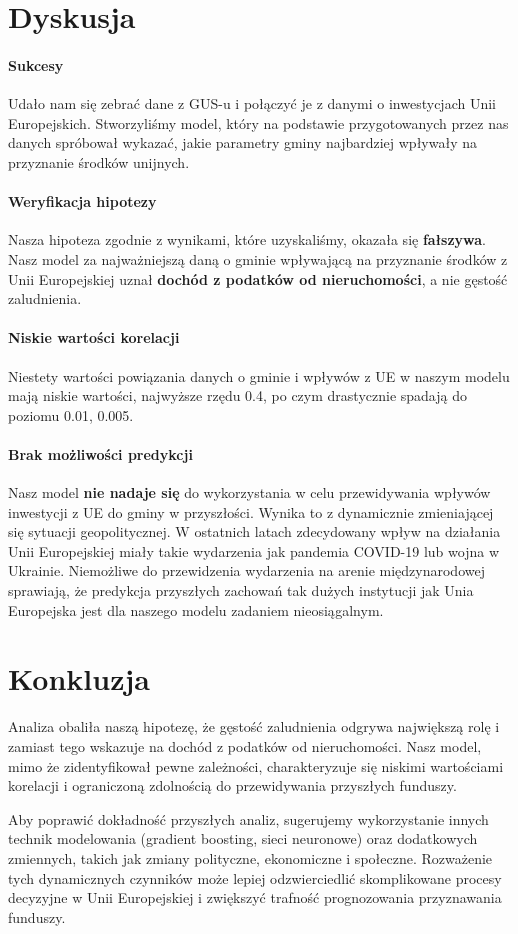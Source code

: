 \documentclass[12pt]{article}
\begin{document}
\section{Dyskusja}
\paragraph{Sukcesy}
Udało nam się zebrać dane z GUS-u i połączyć je z danymi o inwestycjach Unii Europejskich. Stworzyliśmy model, który na podstawie przygotowanych przez nas danych spróbował wykazać, jakie parametry gminy najbardziej wpływały na przyznanie środków unijnych.
\paragraph{Weryfikacja hipotezy}
Nasza hipoteza zgodnie z wynikami, które uzyskaliśmy, okazała się \textbf{fałszywa}. Nasz model za najważniejszą daną o gminie wpływającą na przyznanie środków z Unii Europejskiej uznał \textbf{dochód z podatków od nieruchomości}, a nie gęstość zaludnienia.
\paragraph{Niskie wartości korelacji}
Niestety wartości powiązania danych o gminie i wpływów z UE w naszym modelu mają niskie wartości, najwyższe rzędu 0.4, po czym drastycznie spadają do poziomu 0.01, 0.005.
\paragraph{Brak możliwości predykcji}
Nasz model \textbf{nie nadaje się} do wykorzystania w celu przewidywania wpływów inwestycji z UE do gminy w przyszłości. Wynika to z dynamicznie zmieniającej się sytuacji geopolitycznej. W ostatnich latach zdecydowany wpływ na działania Unii Europejskiej miały takie wydarzenia jak pandemia COVID-19 lub wojna w Ukrainie. Niemożliwe do przewidzenia wydarzenia na arenie międzynarodowej sprawiają, że predykcja przyszłych zachowań tak dużych instytucji jak Unia Europejska jest dla naszego modelu zadaniem nieosiągalnym.

\section{Konkluzja}
Analiza obaliła naszą hipotezę, że gęstość zaludnienia odgrywa największą rolę i zamiast tego wskazuje na dochód z podatków od nieruchomości. Nasz model, mimo że zidentyfikował pewne zależności, charakteryzuje się niskimi wartościami korelacji i ograniczoną zdolnością do przewidywania przyszłych funduszy.

Aby poprawić dokładność przyszłych analiz, sugerujemy wykorzystanie innych technik modelowania (gradient boosting, sieci neuronowe) oraz dodatkowych zmiennych, takich jak zmiany polityczne, ekonomiczne i społeczne. Rozważenie tych dynamicznych czynników może lepiej odzwierciedlić skomplikowane procesy decyzyjne w Unii Europejskiej i zwiększyć trafność prognozowania przyznawania funduszy.

\end{document}
